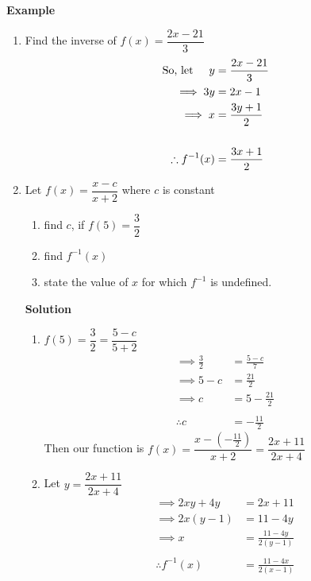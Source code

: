 \documentclass[11pt,a4paper]{article}
\begin{document}
\textbf{Example}
\begin{enumerate}
\item Find the inverse of $f(x)=\dfrac{2x-21}{3}$
\begin{align*}
\text{So, let}\hspace{0.5cm} y &=\frac{2x-21}{3}\\
               \implies 3y & = 2x-1\\
               \implies x & =  \frac{3y+1}{2}\\\\
               \therefore f^{-1}(x) & = \frac{3x+1}{2}\\
\end{align*}

\item Let $f(x)=\dfrac{x-c}{x+2}$ where $c$ is constant
\begin{enumerate}
       \item find $c$, if $f(5)=\dfrac{3}{2}$
       \item find $f^{-1}(x)$
       \item state the value of $x$ for which $f^{-1}$ is undefined.
\end{enumerate}






\pagebreak

\textbf{Solution}
\begin{enumerate}
         \item $f(5)=\dfrac{3}{2}=\dfrac{5-c}{5+2}$
\begin{align*}
\implies \frac{3}{2} & = \frac{5-c}{7}\\
\implies 5-c & = \frac{21}{2}\\
\implies c & = 5-\frac{21}{2}\\\\
\therefore c & = -\frac{11}{2}
\end{align*}
Then our function is $f(x)=\dfrac{x-(-\frac{11}{2})}{x+2}=\dfrac{2x+11}{2x+4}$\\

\item Let $y=\dfrac{2x+11}{2x+4}$
\begin{align*}
\implies 2xy+4y & = 2x+11\\
\implies 2x(y-1) & = 11-4y\\
\implies x & = \frac{11-4y}{2(y-1)}\\\\
\therefore f^{-1}(x) & =\frac{11-4x}{2(x-1)}\\
\end{align*}


\end{enumerate}
\end{enumerate}
\end{document}
